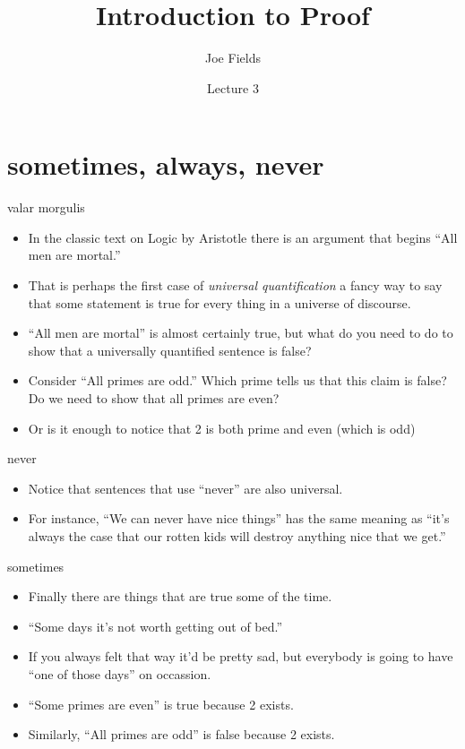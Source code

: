\documentclass[landscape]{beamer}
\author{Joe Fields}
\title{Introduction to Proof}
\date{Lecture 3}
\institute[SCSU]{ {\tt fieldsj1@southernct.edu} }
\begin{document}
\begin{frame}[plain]
  \titlepage
\end{frame}


\section{sometimes, always, never}

\begin{frame}{valar morgulis}
\begin{itemize}
\item In the classic text on Logic by Aristotle there is an argument that begins \newline
``All men are mortal.'' \pause
\item That is perhaps the first case of {\em universal quantification}\textellipsis \newline 
\pause 
 a fancy way to say that some statement is true for every thing in a universe of discourse.\pause
\item ``All men are mortal'' is almost certainly true, but what do you need to do to show that a universally quantified sentence is false?\pause
\item Consider ``All primes are odd.''  Which prime tells us that this claim is false?  Do we need to show that all primes are even? \pause
\item Or is it enough to notice that 2 is both prime and even (which is odd\textellipsis) 
\end{itemize}
\end{frame}

\begin{frame}{never}
\begin{itemize}
\item Notice that sentences that use ``never'' are also universal.
\item For instance, ``We can never have nice things'' has the same meaning as ``it's always the case that our rotten kids will destroy anything nice that we get.''
\end{itemize}
\end{frame}

\begin{frame}{sometimes}
\begin{itemize}
\item Finally there are things that are true some of the time. \pause
\item ``Some days it's not worth getting out of bed.'' \pause
\item If you always felt that way it'd be pretty sad, but everybody is going to have ``one of those days'' on occassion.\pause
\item ``Some primes are even'' is true because 2 exists. \pause
\item Similarly, ``All primes are odd'' is false because 2 exists.
\end{itemize}
\end{frame}
\end{document}
